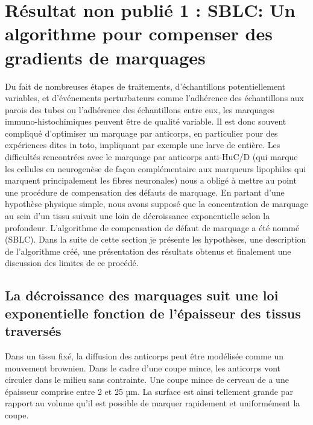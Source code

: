 \documentclass[\main/main.tex]{subfiles}
\begin{document}
\chapter{Résultat non publié 1 :
SBLC: Un algorithme pour compenser des gradients de marquages 
\label{sec:sblc}
}
\chaptermark{\slbc{}}

%
%
Du fait de nombreuses étapes de traitements, d'échantillons potentiellement variables, et d'événements perturbateurs comme l'adhérence des échantillons aux parois des tubes ou l'adhérence des échantillons entre eux, les marquages immuno-histochimiques peuvent être de qualité variable. Il est donc souvent compliqué d'optimiser un marquage par anticorps, en particulier pour des expériences dites in toto, impliquant par exemple une larve de \pz{} entière.
%
Les difficultés rencontrées avec le marquage par anticorps anti-HuC/D (qui marque les cellules en neurogenèse de façon complémentaire aux marqueurs lipophiles qui marquent principalement les fibres neuronales) nous a obligé à mettre au point une procédure de compensation des défauts de marquage.
En partant d'une hypothèse physique simple, nous avons supposé que la concentration de marquage au sein d'un tissu suivait une loin de décroissance exponentielle selon la profondeur.
%
L'algorithme de compensation de défaut de marquage
a été nommé \sblc{} (SBLC).
%
Dans la suite de cette section je présente les hypothèses, une description de l'algorithme créé, une présentation des résultats obtenus et finalement une discussion des limites de ce procédé.

    \section{La décroissance des marquages suit une loi exponentielle fonction de l'épaisseur des tissus traversés}
  
%
Dans un tissu fixé, la diffusion des anticorps peut être modélisée 
comme un mouvement brownien.
%
Dans le cadre d'une coupe mince, les anticorps vont circuler dans le milieu sans contrainte.
%
Une coupe mince de cerveau de \pz{} a une épaisseur comprise entre  2 et 25 µm.
%
La surface est ainsi tellement grande par rapport au volume qu'il est possible de marquer rapidement et uniformément la coupe.
\end{document}
